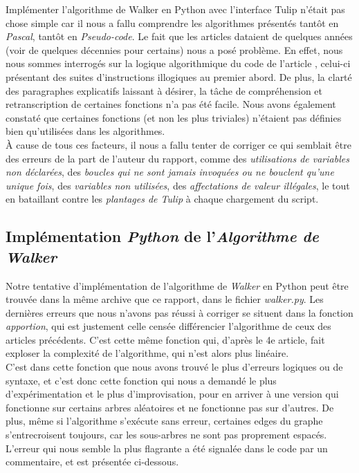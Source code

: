 \documentclass{article}
\begin{document}
Implémenter l'algorithme de Walker en Python avec l'interface Tulip n'était pas chose simple car il nous a fallu comprendre les algorithmes présentés tantôt en \emph{Pascal}, tantôt en \emph{Pseudo-code}. Le fait que les articles dataient de quelques années (voir de quelques décennies pour certains) nous a posé problème. En effet, nous nous sommes interrogés sur la logique algorithmique du code de l'article \cite{article90}, celui-ci présentant des suites d'instructions illogiques au premier abord. De plus, la clarté des paragraphes explicatifs laissant à désirer, la tâche de compréhension et retranscription de certaines fonctions n'a pas été facile. Nous avons également constaté que certaines fonctions (et non les plus triviales) n'étaient pas définies bien qu'utilisées dans les algorithmes.\\

À cause de tous ces facteurs, il nous a fallu tenter de corriger ce qui semblait être des erreurs de la part de l'auteur du rapport, comme des \emph{utilisations de variables non déclarées}, des \emph{boucles qui ne sont jamais invoquées ou ne bouclent qu'une unique fois}, des \emph{variables non utilisées}, des \emph{affectations de valeur illégales}, le tout en bataillant contre les \emph{plantages de Tulip} à  chaque chargement du script.\\

\subsection{Implémentation \emph{Python} de l'\emph{Algorithme de Walker} \cite{article90}}

Notre tentative d'implémentation de l'algorithme de \emph{Walker} en Python peut être trouvée dans la même archive que ce rapport, dans le fichier \emph{walker.py}. Les dernières erreurs que nous n'avons pas réussi à corriger se situent dans la fonction \emph{apportion}, qui est justement celle censée différencier l'algorithme de ceux des articles précédents. C'est cette même fonction qui, d'après le 4e article, fait exploser la complexité de l'algorithme, qui n'est alors plus linéaire.\\

C'est dans cette fonction que nous avons trouvé le plus d'erreurs logiques ou de syntaxe, et c'est donc cette fonction qui nous a demandé le plus d'expérimentation et le plus d'improvisation, pour en arriver à une version qui fonctionne sur certains arbres aléatoires et ne fonctionne pas sur d'autres. De plus, même si l'algorithme s'exécute sans erreur, certaines edges du graphe s'entrecroisent toujours, car les sous-arbres ne sont pas proprement espacés.
L'erreur qui nous semble la plus flagrante a été signalée dans le code par un commentaire, et est présentée ci-dessous.\\
\end{document}
